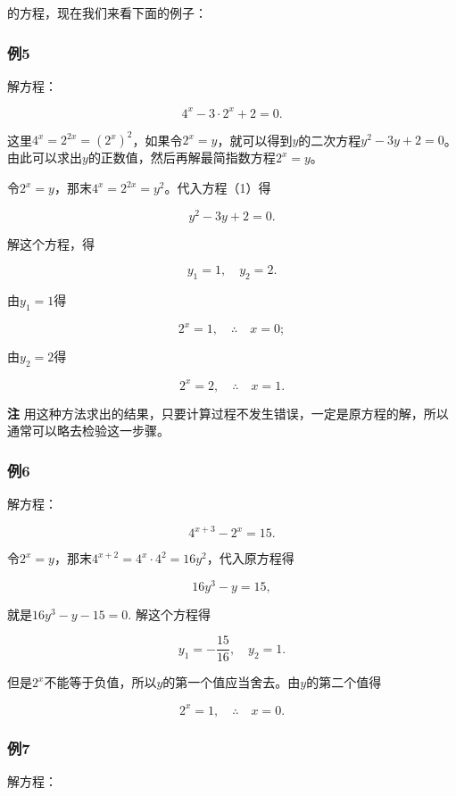 的方程，现在我们来看下面的例子：

\subsubsection{例5}

解方程：

\[
4^{x} - 3 \cdot 2^{x} + 2 = 0. \tag {1}
\]

这里\(4^{x} = 2^{2x} = (2^{x})^{2}\)，如果令\(2^{x} = y\)，就可以得到\(y\)的二次方程\(y^{2} - 3y + 2 = 0\)。由此可以求出\(y\)的正数值，然后再解最简指数方程\(2^{x} = y\)。

令\(2^{x} = y\)，那末\(4^{x} = 2^{2x} = y^{2}\)。代入方程（1）得

\[
y^{2} - 3 y + 2 = 0.
\]

解这个方程，得

\[
y_{1} = 1, \quad y_{2} = 2.
\]

由\(y_{1} = 1\)得

\[
2^{x} = 1, \quad \therefore \quad x = 0;
\]

由\(y_{2} = 2\)得

\[
2^{x} = 2, \quad \therefore \quad x = 1.
\]

\textbf{注}
用这种方法求出的结果，只要计算过程不发生错误，一定是原方程的解，所以通常可以略去检验这一步骤。

\subsubsection{例6}

解方程：

\[
4^{x + 3} - 2^{x} = 15.
\]

令\(2^{x} = y\)，那末\(4^{x + 2} = 4^{x} \cdot 4^{2} = 16y^{2}\)，代入原方程得

\[
16 y^{3} - y = 15,
\]

就是\(16y^{3} - y - 15 = 0.\) 解这个方程得

\[
y_{1} = - \frac{15}{16}, \quad y_{2} = 1.
\]

但是\(2^{x}\)不能等于负值，所以\(y\)的第一个值应当舍去。由\(y\)的第二个值得

\[
2^{x} = 1, \quad \therefore \quad x = 0.
\]

\subsubsection{例7}

解方程：

